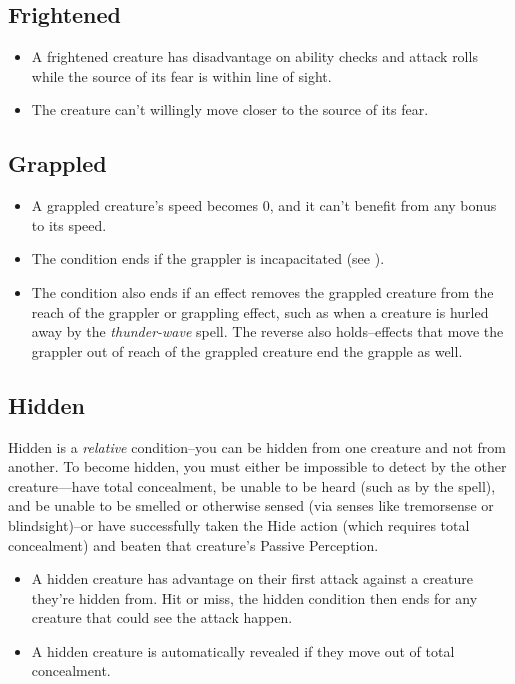 \subsection{Frightened\label{condition:frightened}}
\begin{itemize}
\item A frightened creature has disadvantage on ability checks and attack rolls while the source of its fear is within line of sight.
\item The creature can't willingly move closer to the source of its fear.
\end{itemize}

\subsection{Grappled\label{condition:grappled}}
\begin{itemize}
\item A grappled creature's speed becomes 0, and it can't benefit from any bonus to its speed.
\item The condition ends if the grappler is incapacitated (see ).
\item The condition also ends if an effect removes the grappled creature from the reach of the grappler or grappling effect, such as when a creature is hurled away by the \textit{thunder-wave} spell. The reverse also holds--effects that move the grappler out of reach of the grappled creature end the grapple as well.
\end{itemize}

\subsection{Hidden}\label{condition:hidden}
Hidden is a \textit{relative} condition--you can be hidden from one creature and not from another. To become hidden, you must either be impossible to detect by the other creature---have total concealment, be unable to be heard (such as by the  spell), and be unable to be smelled or otherwise sensed (via senses like tremorsense or blindsight)--or have successfully taken the Hide action (which requires total concealment) and beaten that creature's Passive Perception.
\begin{itemize}
	\item A hidden creature has advantage on their first attack against a creature they're hidden from. Hit or miss, the hidden condition then ends for any creature that could see the attack happen.
	\item A hidden creature is automatically revealed if they move out of total concealment.
\end{itemize}

